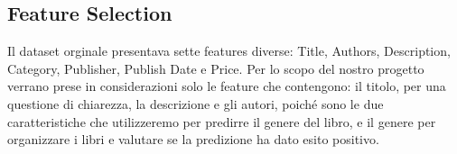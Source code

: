 \documentclass[12pt,oneside]{article}
\begin{document}
    \begin{enumerate}
    \subsection{Feature Selection}
    \begin{justify}
    Il dataset orginale presentava sette features diverse: Title, Authors, Description, Category, Publisher, Publish Date e Price. Per lo scopo del nostro progetto verrano prese in considerazioni solo le feature che contengono: il titolo, per una questione di chiarezza, la descrizione e gli autori, poiché sono le due caratteristiche che utilizzeremo per predirre il genere del libro, e il genere per organizzare i libri e valutare se la predizione ha dato esito positivo.
    \end{justify}
    \end{enumerate}
\end{document}
